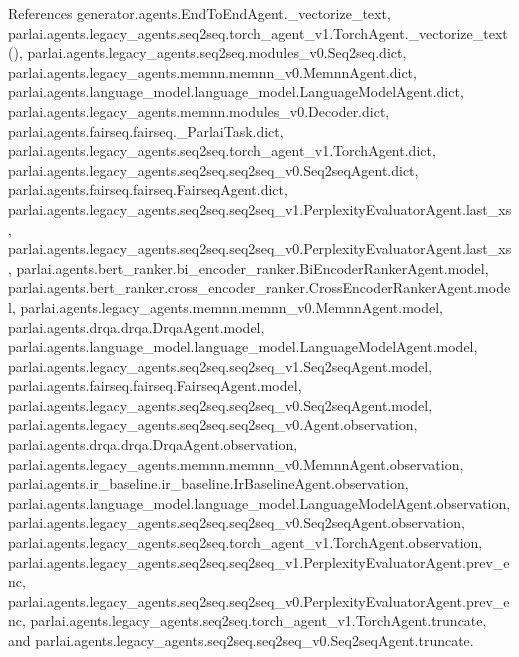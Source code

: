 References generator.\+agents.\+End\+To\+End\+Agent.\+\_\+vectorize\+\_\+text, parlai.\+agents.\+legacy\+\_\+agents.\+seq2seq.\+torch\+\_\+agent\+\_\+v1.\+Torch\+Agent.\+\_\+vectorize\+\_\+text(), parlai.\+agents.\+legacy\+\_\+agents.\+seq2seq.\+modules\+\_\+v0.\+Seq2seq.\+dict, parlai.\+agents.\+legacy\+\_\+agents.\+memnn.\+memnn\+\_\+v0.\+Memnn\+Agent.\+dict, parlai.\+agents.\+language\+\_\+model.\+language\+\_\+model.\+Language\+Model\+Agent.\+dict, parlai.\+agents.\+legacy\+\_\+agents.\+memnn.\+modules\+\_\+v0.\+Decoder.\+dict, parlai.\+agents.\+fairseq.\+fairseq.\+\_\+\+Parlai\+Task.\+dict, parlai.\+agents.\+legacy\+\_\+agents.\+seq2seq.\+torch\+\_\+agent\+\_\+v1.\+Torch\+Agent.\+dict, parlai.\+agents.\+legacy\+\_\+agents.\+seq2seq.\+seq2seq\+\_\+v0.\+Seq2seq\+Agent.\+dict, parlai.\+agents.\+fairseq.\+fairseq.\+Fairseq\+Agent.\+dict, parlai.\+agents.\+legacy\+\_\+agents.\+seq2seq.\+seq2seq\+\_\+v1.\+Perplexity\+Evaluator\+Agent.\+last\+\_\+xs, parlai.\+agents.\+legacy\+\_\+agents.\+seq2seq.\+seq2seq\+\_\+v0.\+Perplexity\+Evaluator\+Agent.\+last\+\_\+xs, parlai.\+agents.\+bert\+\_\+ranker.\+bi\+\_\+encoder\+\_\+ranker.\+Bi\+Encoder\+Ranker\+Agent.\+model, parlai.\+agents.\+bert\+\_\+ranker.\+cross\+\_\+encoder\+\_\+ranker.\+Cross\+Encoder\+Ranker\+Agent.\+model, parlai.\+agents.\+legacy\+\_\+agents.\+memnn.\+memnn\+\_\+v0.\+Memnn\+Agent.\+model, parlai.\+agents.\+drqa.\+drqa.\+Drqa\+Agent.\+model, parlai.\+agents.\+language\+\_\+model.\+language\+\_\+model.\+Language\+Model\+Agent.\+model, parlai.\+agents.\+legacy\+\_\+agents.\+seq2seq.\+seq2seq\+\_\+v1.\+Seq2seq\+Agent.\+model, parlai.\+agents.\+fairseq.\+fairseq.\+Fairseq\+Agent.\+model, parlai.\+agents.\+legacy\+\_\+agents.\+seq2seq.\+seq2seq\+\_\+v0.\+Seq2seq\+Agent.\+model, parlai.\+agents.\+legacy\+\_\+agents.\+seq2seq.\+seq2seq\+\_\+v0.\+Agent.\+observation, parlai.\+agents.\+drqa.\+drqa.\+Drqa\+Agent.\+observation, parlai.\+agents.\+legacy\+\_\+agents.\+memnn.\+memnn\+\_\+v0.\+Memnn\+Agent.\+observation, parlai.\+agents.\+ir\+\_\+baseline.\+ir\+\_\+baseline.\+Ir\+Baseline\+Agent.\+observation, parlai.\+agents.\+language\+\_\+model.\+language\+\_\+model.\+Language\+Model\+Agent.\+observation, parlai.\+agents.\+legacy\+\_\+agents.\+seq2seq.\+seq2seq\+\_\+v0.\+Seq2seq\+Agent.\+observation, parlai.\+agents.\+legacy\+\_\+agents.\+seq2seq.\+torch\+\_\+agent\+\_\+v1.\+Torch\+Agent.\+observation, parlai.\+agents.\+legacy\+\_\+agents.\+seq2seq.\+seq2seq\+\_\+v1.\+Perplexity\+Evaluator\+Agent.\+prev\+\_\+enc, parlai.\+agents.\+legacy\+\_\+agents.\+seq2seq.\+seq2seq\+\_\+v0.\+Perplexity\+Evaluator\+Agent.\+prev\+\_\+enc, parlai.\+agents.\+legacy\+\_\+agents.\+seq2seq.\+torch\+\_\+agent\+\_\+v1.\+Torch\+Agent.\+truncate, and parlai.\+agents.\+legacy\+\_\+agents.\+seq2seq.\+seq2seq\+\_\+v0.\+Seq2seq\+Agent.\+truncate.

